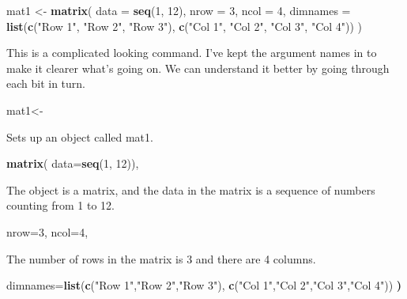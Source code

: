 \documentclass[
]{book}
\newenvironment{Shaded}{\begin{snugshade}}{\end{snugshade}}
\newcommand{\DataTypeTok}[1]{\textcolor[rgb]{0.13,0.29,0.53}{#1}}
\newcommand{\DecValTok}[1]{\textcolor[rgb]{0.00,0.00,0.81}{#1}}
\newcommand{\ErrorTok}[1]{\textcolor[rgb]{0.64,0.00,0.00}{\textbf{#1}}}
\newcommand{\KeywordTok}[1]{\textcolor[rgb]{0.13,0.29,0.53}{\textbf{#1}}}
\newcommand{\NormalTok}[1]{#1}
\newcommand{\StringTok}[1]{\textcolor[rgb]{0.31,0.60,0.02}{#1}}
\begin{document}
\begin{Shaded}
\begin{Highlighting}[]
\NormalTok{mat1 <-}
\StringTok{  }\KeywordTok{matrix}\NormalTok{(}
    \DataTypeTok{data =} \KeywordTok{seq}\NormalTok{(}\DecValTok{1}\NormalTok{, }\DecValTok{12}\NormalTok{),}
    \DataTypeTok{nrow =} \DecValTok{3}\NormalTok{,}
    \DataTypeTok{ncol =} \DecValTok{4}\NormalTok{,}
    \DataTypeTok{dimnames =} \KeywordTok{list}\NormalTok{(}\KeywordTok{c}\NormalTok{(}\StringTok{"Row 1"}\NormalTok{, }\StringTok{"Row 2"}\NormalTok{, }\StringTok{"Row 3"}\NormalTok{), }
                    \KeywordTok{c}\NormalTok{(}\StringTok{"Col 1"}\NormalTok{, }\StringTok{"Col 2"}\NormalTok{, }\StringTok{"Col 3"}\NormalTok{, }\StringTok{"Col 4"}\NormalTok{))}
\NormalTok{  )}
\end{Highlighting}
\end{Shaded}

This is a complicated looking command. I've kept the argument names in to make it clearer what's going on. We can understand it better by going through each bit in turn.

\begin{Shaded}
\begin{Highlighting}[]
\NormalTok{mat1<-}\StringTok{ }
\end{Highlighting}
\end{Shaded}

Sets up an object called mat1.

\begin{Shaded}
\begin{Highlighting}[]
\KeywordTok{matrix}\NormalTok{(}
  \DataTypeTok{data=}\KeywordTok{seq}\NormalTok{(}\DecValTok{1}\NormalTok{, }\DecValTok{12}\NormalTok{)),}
\end{Highlighting}
\end{Shaded}

The object is a matrix, and the data in the matrix is a sequence of numbers counting from 1 to 12.

\begin{Shaded}
\begin{Highlighting}[]
\NormalTok{nrow=}\DecValTok{3}\NormalTok{, }
\NormalTok{ncol=}\DecValTok{4}\NormalTok{,}
\end{Highlighting}
\end{Shaded}

The number of rows in the matrix is 3 and there are 4 columns.

\begin{Shaded}
\begin{Highlighting}[]
\NormalTok{dimnames=}\KeywordTok{list}\NormalTok{(}\KeywordTok{c}\NormalTok{(}\StringTok{"Row 1"}\NormalTok{,}\StringTok{"Row 2"}\NormalTok{,}\StringTok{"Row 3"}\NormalTok{), }
              \KeywordTok{c}\NormalTok{(}\StringTok{"Col 1"}\NormalTok{,}\StringTok{"Col 2"}\NormalTok{,}\StringTok{"Col 3"}\NormalTok{,}\StringTok{"Col 4"}\NormalTok{))}
\ErrorTok{)}
\end{Highlighting}
\end{Shaded}
\end{document}
